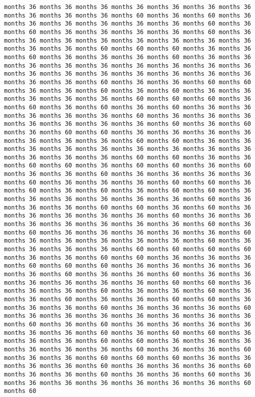 \documentclass[11pt]{article}
\begin{document}
\begin{Verbatim}[commandchars=\\\{\}, frame=single, framerule=2mm, rulecolor=\color{outerrorbackground}]
months 36 months 36 months 36 months 36 months 36 months 36 months 36 months 36 months 36 months 36 months 60 months 36 months 60 months 36 months 36 months 36 months 36 months 36 months 36 months 60 months 36 months 60 months 36 months 36 months 36 months 36 months 60 months 36 months 36 months 36 months 36 months 36 months 36 months 36 months 36 months 36 months 36 months 60 months 60 months 60 months 36 months 36 months 60 months 36 months 36 months 36 months 60 months 36 months 36 months 36 months 36 months 36 months 36 months 36 months 36 months 36 months 36 months 36 months 36 months 36 months 36 months 36 months 36 months 36 months 36 months 60 months 36 months 36 months 60 months 60 months 36 months 36 months 60 months 36 months 60 months 36 months 36 months 36 months 36 months 36 months 60 months 60 months 60 months 36 months 60 months 36 months 60 months 36 months 60 months 36 months 36 months 36 months 36 months 36 months 60 months 36 months 36 months 36 months 36 months 36 months 36 months 36 months 60 months 36 months 60 months 36 months 60 months 60 months 36 months 36 months 36 months 36 months 36 months 36 months 36 months 60 months 60 months 36 months 36 months 36 months 36 months 36 months 36 months 36 months 36 months 36 months 36 months 36 months 36 months 60 months 60 months 36 months 36 months 60 months 60 months 36 months 60 months 60 months 36 months 60 months 36 months 36 months 60 months 36 months 36 months 36 months 36 months 60 months 36 months 36 months 36 months 60 months 60 months 36 months 60 months 36 months 60 months 36 months 60 months 60 months 36 months 36 months 36 months 36 months 36 months 36 months 60 months 36 months 36 months 36 months 60 months 60 months 36 months 60 months 36 months 36 months 36 months 36 months 36 months 60 months 36 months 36 months 36 months 36 months 36 months 36 months 36 months 60 months 36 months 60 months 36 months 36 months 36 months 36 months 36 months 60 months 36 months 36 months 36 months 36 months 36 months 60 months 36 months 36 months 36 months 36 months 60 months 60 months 60 months 60 months 36 months 36 months 60 months 60 months 36 months 36 months 36 months 60 months 60 months 60 months 36 months 36 months 36 months 36 months 36 months 60 months 36 months 36 months 60 months 36 months 36 months 36 months 36 months 36 months 36 months 60 months 60 months 36 months 36 months 36 months 60 months 36 months 36 months 60 months 36 months 36 months 60 months 36 months 36 months 60 months 60 months 36 months 36 months 36 months 60 months 36 months 36 months 36 months 60 months 36 months 36 months 36 months 36 months 36 months 36 months 36 months 60 months 36 months 60 months 36 months 36 months 36 months 36 months 36 months 36 months 60 months 36 months 60 months 60 months 36 months 36 months 36 months 60 months 60 months 36 months 36 months 36 months 36 months 36 months 36 months 60 months 36 months 36 months 60 months 36 months 36 months 60 months 60 months 60 months 36 months 36 months 36 months 36 months 60 months 36 months 36 months 36 months 60 months 36 months 36 months 60 months 36 months 36 months 60 months 36 months 36 months 36 months 36 months 36 months 36 months 36 months 60 months 60 
\end{Verbatim}
\end{document}
